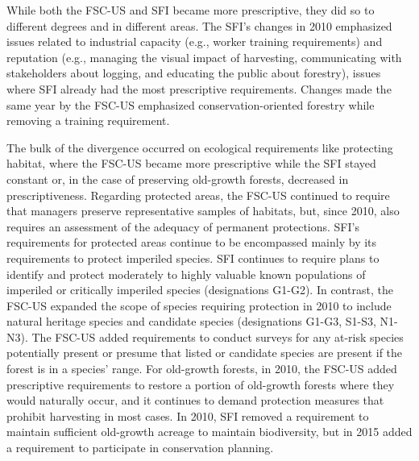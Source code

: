 \documentclass[
      12pt,
            Review ]{article}
\begin{document}


While both the FSC-US and SFI became more prescriptive, they did so to different degrees and in different areas. The SFI's changes in 2010 emphasized issues related to industrial capacity (e.g., worker training requirements) and reputation (e.g., managing the visual impact of harvesting, communicating with stakeholders about logging, and educating the public about forestry), issues where SFI already had the most prescriptive requirements. Changes made the same year by the FSC-US emphasized conservation-oriented forestry while removing a training requirement.

The bulk of the divergence occurred on ecological requirements like protecting habitat, where the FSC-US became more prescriptive while the SFI stayed constant or, in the case of preserving old-growth forests, decreased in prescriptiveness. Regarding protected areas, the FSC-US continued to require that managers preserve representative samples of habitats, but, since 2010, also requires an assessment of the adequacy of permanent protections. SFI's requirements for protected areas continue to be encompassed mainly by its requirements to protect imperiled species. SFI continues to require plans to identify and protect moderately to highly valuable known populations of imperiled or critically imperiled species (designations G1-G2). In contrast, the FSC-US expanded the scope of species requiring protection in 2010 to include natural heritage species and candidate species (designations G1-G3, S1-S3, N1-N3). The FSC-US added requirements to conduct surveys for any at-risk species potentially present or presume that listed or candidate species are present if the forest is in a species' range. For old-growth forests, in 2010, the FSC-US added prescriptive requirements to restore a portion of old-growth forests where they would naturally occur, and it continues to demand protection measures that prohibit harvesting in most cases. In 2010, SFI removed a requirement to maintain sufficient old-growth acreage to maintain biodiversity, but in 2015 added a requirement to participate in conservation planning.
\end{document}
